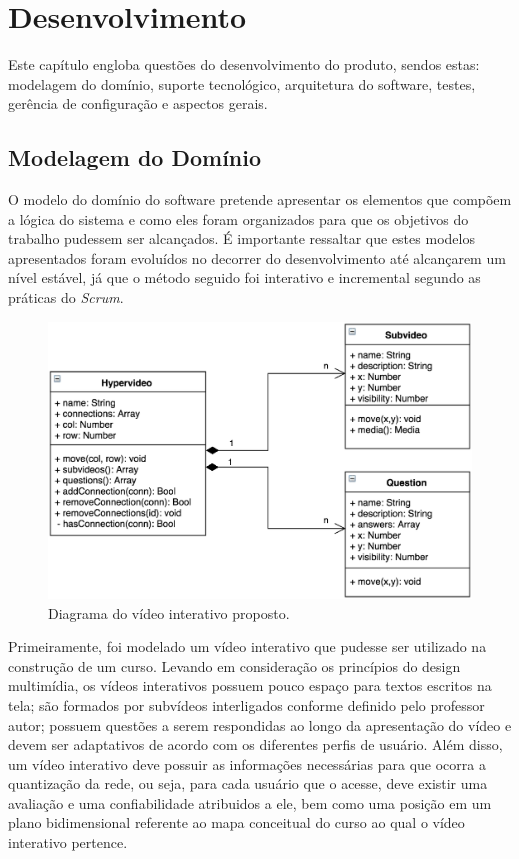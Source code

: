 \chapter[Desenvolvimento]{Desenvolvimento}

Este capítulo engloba questões do desenvolvimento do produto, sendos estas: modelagem do domínio, suporte tecnológico, arquitetura do software, testes, gerência de configuração e aspectos gerais.

\section{Modelagem do Domínio}

O modelo do domínio do software pretende apresentar os elementos que compõem a lógica do sistema e como eles foram organizados para que os objetivos do trabalho pudessem ser alcançados. É importante ressaltar que estes modelos apresentados foram evoluídos no decorrer do desenvolvimento até alcançarem um nível estável, já que o método seguido foi interativo e incremental segundo as práticas do \textit{Scrum}.

\begin{figure}[h!]
	\centering
  	\includegraphics[width=.6\linewidth]{figuras/video.eps}
  	\caption{Diagrama do vídeo interativo proposto.}
  	\label{fig:video}
\end{figure}

Primeiramente, foi modelado um vídeo interativo que pudesse ser utilizado na construção de um curso. Levando em consideração os princípios do design multimídia, os vídeos interativos possuem pouco espaço para textos escritos na tela; são formados por subvídeos interligados conforme definido pelo professor autor; possuem questões a serem respondidas ao longo da apresentação do vídeo e devem ser adaptativos de acordo com os diferentes perfis de usuário. Além disso, um vídeo interativo deve possuir as informações necessárias para que ocorra a quantização da rede, ou seja, para cada usuário que o acesse, deve existir uma avaliação e uma confiabilidade atribuidos a ele, bem como uma posição em um plano bidimensional referente ao mapa conceitual do curso ao qual o vídeo interativo pertence. 

